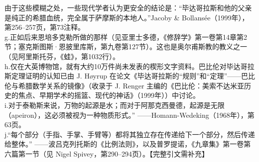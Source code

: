 由于这些模糊之处，一些现代学者认为更安全的结论是：“毕达哥拉斯和他的父亲是纯正的希腊血统，完全属于萨摩斯的本地人。”Jacoby & Bollansée（1999年），第256–257页，第73注释。\\
g.正如后来恩培多克勒所做的那样（见亚里士多德，《修辞学》第一卷第14章第2节；塞克斯图斯·恩披里库斯，第九卷第127节）。这也是奥尔甫斯教的教义之一（见阿里斯托芬，《蛙》，第1032行）。\\  
h.仅在大英博物馆，就有大约10万件尚未发表的楔形文字资料。巴比伦对毕达哥拉斯定理证明的认知已由 J. Høyrup 在论文《毕达哥拉斯的“规则”和“定理”——巴比伦与希腊数学关系的镜像》（收录于 J. Renger 主编的《巴比伦：美索不达米亚历史的焦点、早期学术的摇篮、现代的神话》（1999年））中讨论。\\ 
i.对于泰勒斯来说，万物的起源是水；而对于阿那克西曼德，起源是无限（apeiron），这必须被视为一种物质形式。” ——Homann-Wedeking（1968年），第63页。\\  
j.“每个部分（手指、手掌、手臂等）都将其独立存在传递给下一个部分，然后传递给整体。” ——波吕克列托斯的《比例法则》，以及普罗提诺，《九章集》第一卷第六篇第一节（见 Nigel Spivey，第290–294页）。【完整引文需补充】\\
